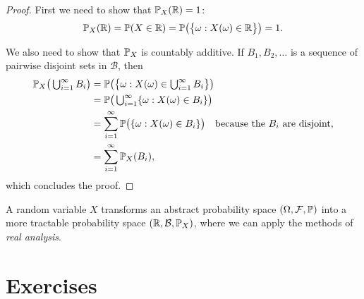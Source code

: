\begin{proof}
First we need to show that $\mathbb{P}_X(\mathbb{R}) = 1$:
\[
\mathbb{P}_X(\mathbb{R}) = \mathbb{P}(X\in\mathbb{R}) = \mathbb{P}\big(\big\{\omega:X(\omega)\in\mathbb{R}\big\}\big) = 1. 
\]

We also need to show that $\mathbb{P}_X$ is countably additive. If $B_1,B_2,\ldots$ is a sequence of pairwise disjoint sets in $\mathcal{B}$, then
\begin{align*}
\mathbb{P}_X\big(\textstyle\bigcup_{i=1}^{\infty} B_i\big)
	& = \mathbb{P}\big(\big\{\omega : X(\omega)\in \textstyle\bigcup_{i=1}^{\infty} B_i\big\}\big) \\
	& = \mathbb{P}\big(\textstyle\bigcup_{i=1}^{\infty} \{\omega : X(\omega)\in B_i\}\big) \\
	& = \sum_{i=1}^{\infty} \mathbb{P}\big(\{\omega : X(\omega)\in B_i\}\big) \quad\text{because the $B_i$ are disjoint,} \\
	& = \sum_{i=1}^{\infty} \mathbb{P}_X(B_i),
\end{align*}
which concludes the proof.
\end{proof}


\begin{remark}
A random variable $X$ transforms an abstract probability space $(\Omega,\mathcal{F},\mathbb{P})$ into a more tractable probability space $(\mathbb{R},\mathcal{B},\mathbb{P}_X)$, where we can apply the methods of \emph{real analysis}.
\end{remark}


\section{Exercises}


\endinput

